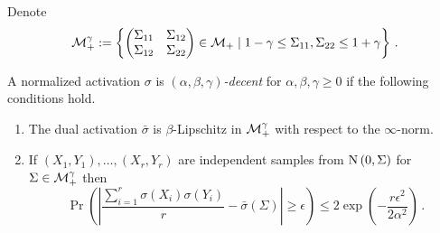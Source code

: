 Denote
$${\cal M}^\gamma_+:=\left\{\begin{pmatrix}
\Sigma_{11} & \Sigma_{12}\\
\Sigma_{12} & \Sigma_{22}
\end{pmatrix}\in {\cal M}_+\mid 1-\gamma\le \Sigma_{11},\Sigma_{22}
	\le 1+\gamma\right\} \,. $$
\begin{definition}
A normalized activation $\sigma$ is {\em
$(\alpha,\beta,\gamma)$-decent} for $\alpha,\beta,\gamma\ge 0$ if the
following conditions hold.
\begin{enumerate}[label=(\roman*)]
\item The dual activation $\bar\sigma$ is $\beta$-Lipschitz in
	${\cal M}_+^\gamma$ with respect to the $\infty$-norm.

\item If $(X_1,Y_1),\ldots,(X_r,Y_r)$ are independent samples from
	$\text{N}\left(0,\Sigma\right)$ for $\Sigma\in {\cal M}_+^\gamma$ then
\[
\Pr\left(\left|\frac{\sum_{i=1}^r\sigma(X_i)\sigma(Y_i)}{r} -
	\bar\sigma(\Sigma)\right|\ge\epsilon\right)
	\le 2\exp\left(-\frac{r\epsilon^2}{2\alpha^2}\right) \,.
\]
\end{enumerate}
\end{definition}

